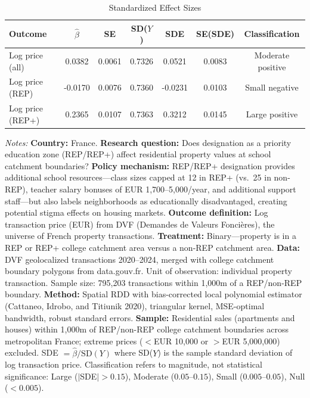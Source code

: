 \begin{table}[htbp]
\centering
\caption{Standardized Effect Sizes}
\label{tab:sde}
\begin{tabular}{lcccccc}
\toprule
Outcome & $\hat{\beta}$ & SE & SD($Y$) & SDE & SE(SDE) & Classification \\
\midrule
Log price (all) & 0.0382 & 0.0061 & 0.7326 & 0.0521 & 0.0083 & Moderate positive \\
Log price (REP) & -0.0170 & 0.0076 & 0.7360 & -0.0231 & 0.0103 & Small negative \\
Log price (REP+) & 0.2365 & 0.0107 & 0.7363 & 0.3212 & 0.0145 & Large positive \\
\bottomrule
\end{tabular}
\begin{tablenotes}
\small
\item \textit{Notes:} \textbf{Country:} France. \textbf{Research question:} Does designation as a priority education zone (REP/REP+) affect residential property values at school catchment boundaries? \textbf{Policy mechanism:} REP/REP+ designation provides additional school resources---class sizes capped at 12 in REP+ (vs.\ 25 in non-REP), teacher salary bonuses of EUR 1,700--5,000/year, and additional support staff---but also labels neighborhoods as educationally disadvantaged, creating potential stigma effects on housing markets. \textbf{Outcome definition:} Log transaction price (EUR) from DVF (Demandes de Valeurs Fonci\`{e}res), the universe of French property transactions. \textbf{Treatment:} Binary---property is in a REP or REP+ college catchment area versus a non-REP catchment area. \textbf{Data:} DVF geolocalized transactions 2020--2024, merged with college catchment boundary polygons from data.gouv.fr. Unit of observation: individual property transaction. Sample size: 795,203 transactions within 1,000m of a REP/non-REP boundary. \textbf{Method:} Spatial RDD with bias-corrected local polynomial estimator (Cattaneo, Idrobo, and Titiunik 2020), triangular kernel, MSE-optimal bandwidth, robust standard errors. \textbf{Sample:} Residential sales (apartments and houses) within 1,000m of REP/non-REP college catchment boundaries across metropolitan France; extreme prices ($<$EUR 10,000 or $>$EUR 5,000,000) excluded. SDE $= \hat{\beta} / \text{SD}(Y)$ where SD($Y$) is the sample standard deviation of log transaction price. Classification refers to magnitude, not statistical significance: Large ($|$SDE$| > 0.15$), Moderate ($0.05$--$0.15$), Small ($0.005$--$0.05$), Null ($< 0.005$).
\end{tablenotes}
\end{table}
